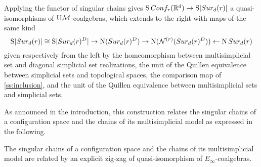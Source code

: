 Applying the functor of singular chains gives
$\operatorname{S}Conf_{r}(\mathbb{R}^{d}) \to \operatorname{S}\lvert Sur_{d}(r)\rvert$
a quasi-isomorphisms of $\mathrm{U}\mathcal{M}$-coalgebras, which extends to the right with maps of the same kind
\[
\operatorname{S}\lvert Sur_{d}(r)\rvert \cong
\operatorname{S} \lvert Sur_{d}(r)^{D}\rvert \to
\operatorname{N}(Sur_{d}(r)^D) \to
\operatorname{N}(\mathcal{N}^{(r)}(Sur_{d}(r)^D)) \leftarrow
\operatorname{N}Sur_{d}(r)
\]
given respectively from the left by the homeomorphism between multisimplicial set and diagonal simplicial set realizations, the unit of the Quillen equivalence between simplicial sets and topological spaces, the comparison map of \cref{ss:inclusion}, and the unit of the Quillen equivalence between multisimplicial sets and simplicial sets.

As announced in the introduction, this construction relates the singular chains of a configuration space and the chains of its multisimplicial model as expressed in the following.

\begin{theorem}
	The singular chains of a configuration space and the chains of its multisimplicial model are related by an explicit zig-zag of quasi-isomorphism of $E_\infty$-coalgebras.
\end{theorem}